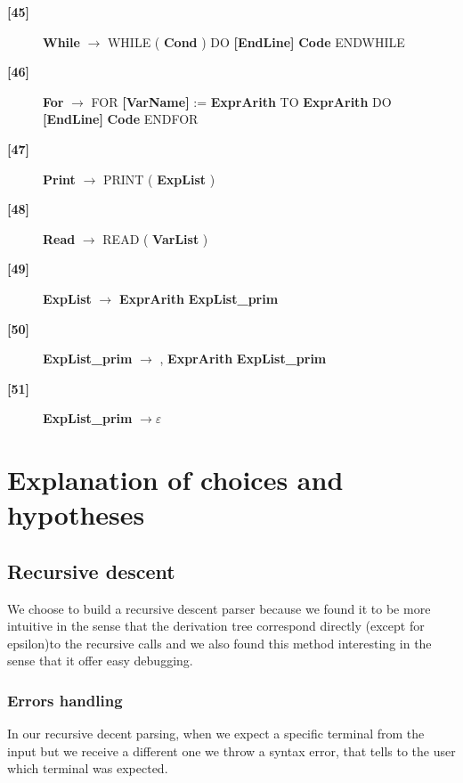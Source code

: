 \documentclass[12pt]{article}
\begin{document}
\begin{description}
\item[\textbf{[45]}]{ \textbf{\textlangle{}While\textrangle{}}  $\rightarrow$ WHILE ( \textbf{\textlangle{}Cond\textrangle{}}  ) DO \textbf{[EndLine]} \textbf{\textlangle{}Code\textrangle{}}  ENDWHILE}
\item[\textbf{[46]}]{ \textbf{\textlangle{}For\textrangle{}}  $\rightarrow$ FOR \textbf{[VarName]} := \textbf{\textlangle{}ExprArith\textrangle{}}  TO \textbf{\textlangle{}ExprArith\textrangle{}}  DO \textbf{[EndLine]} \textbf{\textlangle{}Code\textrangle{}}  ENDFOR}
\item[\textbf{[47]}]{ \textbf{\textlangle{}Print\textrangle{}}  $\rightarrow$ PRINT ( \textbf{\textlangle{}ExpList\textrangle{}}  )}
\item[\textbf{[48]}]{ \textbf{\textlangle{}Read\textrangle{}}  $\rightarrow$ READ ( \textbf{\textlangle{}VarList\textrangle{}}  )}
\item[\textbf{[49]}]{ \textbf{\textlangle{}ExpList\textrangle{}}  $\rightarrow$ \textbf{\textlangle{}ExprArith\textrangle{}}  \textbf{\textlangle{}ExpList\_prim\textrangle{}} }
\item[\textbf{[50]}]{ \textbf{\textlangle{}ExpList\_prim\textrangle{}}  $\rightarrow$ , \textbf{\textlangle{}ExprArith\textrangle{}}  \textbf{\textlangle{}ExpList\_prim\textrangle{}} }
\item[\textbf{[51]}]{ \textbf{\textlangle{}ExpList\_prim\textrangle{}}  $\rightarrow \varepsilon$}

\end{description}

\section{Explanation of choices and hypotheses}

\subsection{Recursive descent}
We choose to build a recursive descent parser because we found it to be more intuitive in the sense
that the derivation tree correspond directly (except for epsilon)to the recursive calls and we also 
found this method interesting in the sense that it offer easy debugging.

\subsubsection{Errors handling}
In our recursive decent parsing, when we expect a specific terminal from the input but 
we receive a different one we throw a syntax error, that tells to the user which terminal was expected.  
\end{document}
